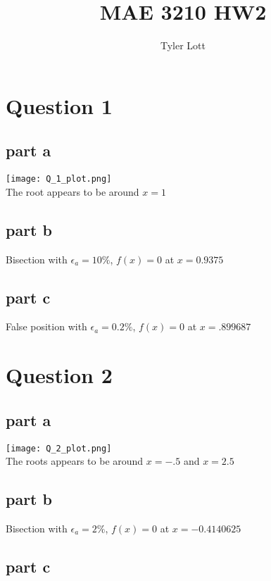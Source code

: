 \documentclass[11pt]{article} %
\title{MAE 3210  HW2}
\author{Tyler Lott}
\begin{document}
\maketitle

\section{Question 1}

\subsection{part a}

\texttt{[image: Q\_1\_plot.png]} \\
The root appears to be around $x=1$

\subsection{part b}

Bisection with $\epsilon_a = 10\%$, $ f(x) = 0$ at {\boldmath$ x = 0.9375 $}

\subsection{part c}

False position with $\epsilon_a = 0.2\%$, $f(x) = 0$ at {\boldmath$x = .899687$}

\section{Question 2}

\subsection{part a}

\texttt{[image: Q\_2\_plot.png]} \\
The roots appears to be around $x=-.5$ and $x=2.5$

\subsection{part b}

Bisection with $\epsilon_a = 2\%$,  $ f(x) = 0$ at {\boldmath$x = -0.4140625$}

\subsection{part c}
\end{document}
